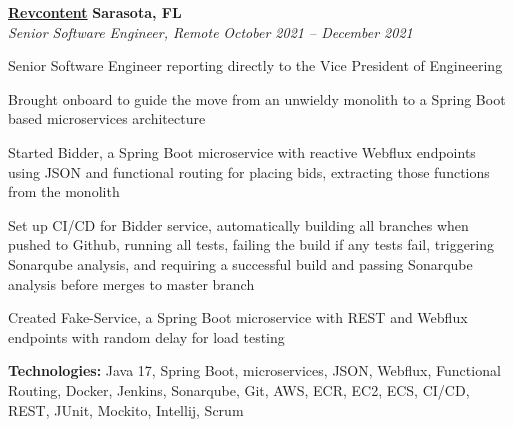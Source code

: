 %
    \headerrow
        {\textbf{\href{https://www.revcontent.com/}{Revcontent}}}
        {\textbf{Sarasota, FL}}
    \\
    \headerrow
        {\emph{Senior Software Engineer, Remote}}
        {\emph{October 2021 -- December 2021}}
    \begin{itemize*}
        \item Senior Software Engineer reporting directly to the Vice President of Engineering
        \item Brought onboard to guide the move from an unwieldy monolith to a Spring Boot based
            microservices architecture
        \item Started Bidder, a Spring Boot microservice with reactive Webflux endpoints using JSON and functional
            routing for placing bids, extracting those functions from the monolith
        \item Set up CI/CD for Bidder service, automatically building all branches when pushed to Github,
            running all tests, failing the build if any tests fail, triggering Sonarqube analysis, and requiring
            a successful build and passing Sonarqube analysis before merges to master branch
        \item Created Fake-Service, a Spring Boot microservice with REST and Webflux endpoints with random
            delay for load testing
    \end{itemize*}

    \hspace{1.0em}
        {\textbf{Technologies:} Java 17, Spring Boot, microservices, JSON, Webflux, Functional Routing,
        Docker, Jenkins, Sonarqube, Git, AWS, ECR, EC2, ECS, CI/CD, REST, JUnit, Mockito, Intellij, Scrum}

